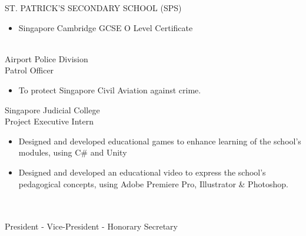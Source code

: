 \documentclass[a4paper,10pt]{article}
\begin{document}
\begin{paracol}{2}
\begin{rightcolumn}
      \normalsize\noindent\latobold ST. PATRICK'S SECONDARY SCHOOL (SPS) \hfill\small{}
      \begin{itemize}[left=0pt, labelsep=0.5em, itemsep=0pt, topsep=0pt, parsep=0pt, partopsep=0pt]
        \item \lato Singapore Cambridge GCSE O Level Certificate
      \end{itemize}
      \vspace{0.35cm}
      \Large\noindent{}
      \vspace{0.15cm}\\
      \normalsize{} \textbar{} Airport Police Division \hfill\small{}\\
      \latobold Patrol Officer
        \begin{itemize}[left=0pt, labelsep=0.5em, itemsep=0pt, topsep=0pt, parsep=0pt, partopsep=0pt]
          \item \lato To protect Singapore Civil Aviation against crime.
        \end{itemize}
      \vspace{0.35cm}
      \normalsize\noindent{} \textbar{} Singapore Judicial College \hfill\small{}\\
      \latobold Project Executive Intern
        \begin{itemize}[left=0pt, labelsep=0.5em, itemsep=0pt, topsep=0pt, parsep=0pt, partopsep=0pt]
          \item \lato Designed and developed educational games to enhance learning of the school's modules, using C\# and Unity
          \item \lato Designed and developed an educational video to express the school's pedagogical concepts, using Adobe Premiere Pro, Illustrator \& Photoshop.
        \end{itemize}
      \vspace{0.35cm}
      \Large\noindent{}
      \vspace{0.15cm}\\
      \normalsize{} \hfill\small{}\\
      \latobold President - Vice-President - Honorary Secretary
      \begin{itemize}[left=0pt, labelsep=0.5em, itemsep=0pt, topsep=0pt, parsep=0pt, partopsep=0pt]

\end{itemize}
\end{rightcolumn}
\end{paracol}
\end{document}
